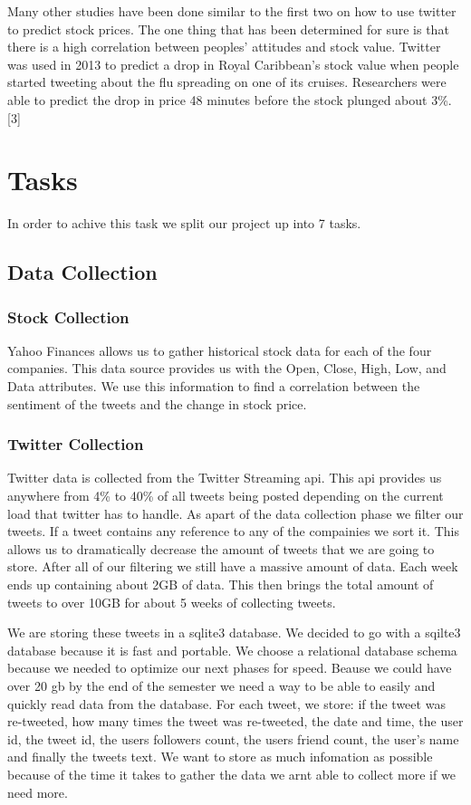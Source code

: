 \documentclass{acm_proc_article-sp}
\begin{document}
Many other studies have been done similar to the first two on how to use
twitter to predict stock prices. The one thing that has been determined for
sure is that there is a high correlation between peoples' attitudes and stock
value. Twitter was used in 2013 to predict a drop in Royal Caribbean's stock
value when people started tweeting about the flu spreading on one of its
cruises. Researchers were able to predict the drop in price 48 minutes before
the stock plunged about 3\%.[3]

\section{Tasks}
In order to achive this task we split our project up into 7 tasks.

\subsection{Data Collection} 
\subsubsection{Stock Collection} 

Yahoo Finances allows us to gather historical stock data for each of the four
companies.  This data source provides us with the Open, Close, High, Low, and
Data attributes. We use this information to find a correlation between the
sentiment of the tweets and the change in stock price.

\subsubsection{Twitter Collection} 

Twitter data is collected from the Twitter Streaming api. This api provides us
anywhere from 4\% to 40\% of all tweets being posted depending on the current
load that twitter has to handle. As apart of the data collection phase we
filter our tweets. If a tweet contains any reference to any of the compainies
we sort it. This allows us to dramatically decrease the amount of tweets that
we are going to store. After all of our filtering we still have a massive
amount of data. Each week ends up containing about 2GB of data. This then
brings the total amount of tweets to over 10GB for about 5 weeks of collecting
tweets. 

We are storing these tweets in a sqlite3 database. We decided to go with a
sqilte3 database because it is fast and portable. We choose a relational
database schema because we needed to optimize our next phases for speed. Beause
we could have over 20 gb by the end of the semester we need a way to be able to
easily and quickly read data from the database. For each tweet, we store:  if
the tweet was re-tweeted, how many times the tweet was re-tweeted, the date and
time, the user id, the tweet id, the users followers count, the users friend
count, the user's name and finally the tweets text. We want to store as much
infomation as possible because of the time it takes to gather the data we arnt
able to collect more if we need more. 
\end{document}
